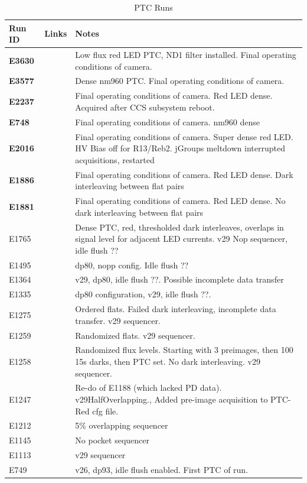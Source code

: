 \begin{table}[ht]\label{table:runs_PTCs}
\centering
\caption{PTC Runs}
\begin{tabular}{|p{1.5cm}|p{2.9cm}|p{9cm}|}
\hline

Run ID & Links & Notes \\ \hline

\textbf{E3630} & & Low flux red LED PTC, ND1 filter installed. Final operating conditions of camera.\\ \hline
\textbf{E3577} & & Dense nm960 PTC. Final operating conditions of camera.\\ \hline
\textbf{E2237} & & Final operating conditions of camera. Red LED dense. Acquired after CCS subsystem reboot. \\ \hline
\textbf{E748} & & Final operating conditions of camera. nm960 dense \\ \hline
\textbf{E2016} & & Final operating conditions of camera. Super dense red LED. HV Bias off for R13/Reb2. jGroups meltdown interrupted acquisitions, restarted \\ \hline
\textbf{E1886} & & Final operating conditions of camera. Red LED dense. Dark interleaving between flat pairs \\ \hline
\textbf{E1881} & & Final operating conditions of camera. Red LED dense. No dark interleaving between flat pairs \\ \hline
E1765 & & Dense PTC, red, thresholded dark interleaves, overlaps in signal level for adjacent LED currents. v29 Nop sequencer, idle flush ??\\ \hline
E1495 & & dp80, nopp config. Idle flush ??\\ \hline
E1364 & & v29, dp80, idle flush ??. Possible incomplete data transfer\\ \hline
E1335 & & dp80 configuration, v29, idle flush ??.\\ \hline
E1275 & & Ordered flats. Failed dark interleaving, incomplete data transfer. v29 sequencer.\\ \hline
E1259 & & Randomized flats. v29 sequencer. \\ \hline
E1258 & & Randomized flux levels. Starting with 3 preimages, then 100 15s darks, then PTC set. No dark interleaving. v29 sequencer. \\ \hline
E1247 & & Re-do of E1188 (which lacked PD data). v29HalfOverlapping., Added pre-image acquisition to PTC-Red cfg file. \\ \hline
E1212 & & 5\% overlapping sequencer\\ \hline
E1145 & & No pocket sequencer\\ \hline
E1113 & & v29 sequencer\\ \hline
E749 & & v26, dp93, idle flush enabled. First PTC of run. \\ \hline
\end{tabular}
\end{table}

